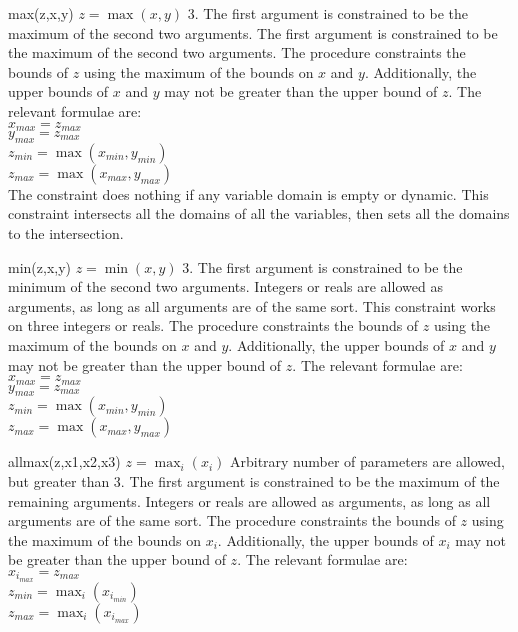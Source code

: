     {max(z,x,y)}
    {$z=\max(x,y)$}
    {3.  The first argument is constrained to be the maximum of the second two
    arguments.}
    {The first argument is constrained to be
    the maximum of the second two arguments.
    The procedure constraints the bounds of $z$
    using the maximum of the bounds on $x$ and $y$.  Additionally, the upper bounds
    of $x$ and $y$ may not be greater than the upper bound of $z$.  The relevant
    formulae are:\\
    $x_{max} = z_{max}$\\
    $y_{max} = z_{max}$\\
    $z_{min} = \max(x_{min},y_{min})$\\
    $z_{max} = \max(x_{max},y_{max})$\\
    The constraint does nothing if any variable domain is empty or dynamic.}
    {This constraint intersects all the domains
    of all the variables, then sets all the domains to the intersection.}

    {min(z,x,y)}
    {$z=\min(x,y)$}
    {3.  The first argument is constrained to be the minimum of the second two
    arguments.}
    {Integers or reals are allowed as arguments, as long as all arguments
    are of the same sort.}
    {This constraint
    works on three integers or reals.  The procedure constraints the bounds of $z$
    using the maximum of the bounds on $x$ and $y$.  Additionally, the upper bounds
    of $x$ and $y$ may not be greater than the upper bound of $z$.  The relevant
    formulae are:\\
    $x_{max} = z_{max}$\\
    $y_{max} = z_{max}$\\
    $z_{min} = \max(x_{min},y_{min})$\\
    $z_{max} = \max(x_{max},y_{max})$}

    {allmax(z,x1,x2,x3)}
    {$z=\max_i(x_i)$}
    {Arbitrary number of parameters are allowed, but greater than 3.  
    The first argument is constrained to be the maximum of the remaining 
    arguments.}
    {Integers or reals are allowed as arguments, as long as all arguments
    are of the same sort.}
    {The procedure constraints the bounds of $z$
    using the maximum of the bounds on $x_i$.  Additionally, the upper bounds
    of $x_i$ may not be greater than the upper bound of $z$.  The relevant
    formulae are:\\
    $x_{i_{max}} = z_{max}$\\
    $z_{min} = \max_i(x_{i_{min}})$\\
    $z_{max} = \max_i(x_{i_{max}})$}

